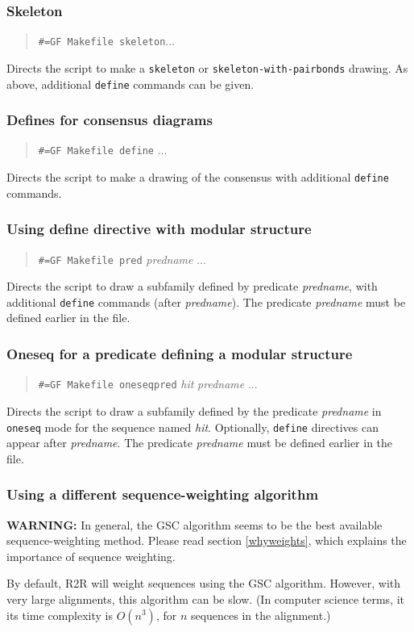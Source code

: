 \documentclass[letterpaper,12pt]{report}
\newcommand{\example}[1]{
\begin{quote}
{\raggedright
#1
}
\end{quote}
}
\begin{document}
\subsubsection{Skeleton}

\example{
{\tt \#=GF Makefile skeleton}...
}
Directs the script to make a {\tt skeleton} or {\tt skeleton-with-pairbonds} drawing.
As above, additional {\tt define} commands can be given.

\subsubsection{Defines for consensus diagrams}

\example{
{\tt \#=GF Makefile define} ...
}
Directs the script to make a drawing of the consensus with additional {\tt define} commands.

\subsubsection{Using define directive with modular structure}
\example{
{\tt \#=GF Makefile pred} {\it predname} ...
}
Directs the script to draw a subfamily defined by predicate {\it predname}, with additional {\tt define} commands (after {\it predname}).
The predicate {\it predname} must be defined earlier in the file.

\subsubsection{Oneseq for a predicate defining a modular structure}

\example{
{\tt \#=GF Makefile oneseqpred} {\it hit} {\it predname} ...
}
Directs the script to draw a subfamily defined by the predicate {\it predname}
in {\tt oneseq} mode for the sequence named {\it hit}.  Optionally, {\tt define}
directives can appear after {\it predname}.
The predicate {\it predname} must be defined earlier in the file.

\subsubsection{Using a different sequence-weighting algorithm}
\label{makefileseqweighting}

{\bf WARNING:} In general, the GSC algorithm seems to be the best available sequence-weighting method.  Please read section \ref{whyweights}, which explains the importance of sequence weighting.

By default, R2R will weight sequences using the GSC algorithm.  However, with very large alignments, this algorithm can be slow.  (In computer science terms, it its time complexity is $O(n^3)$, for $n$ sequences in the alignment.)
\end{document}

